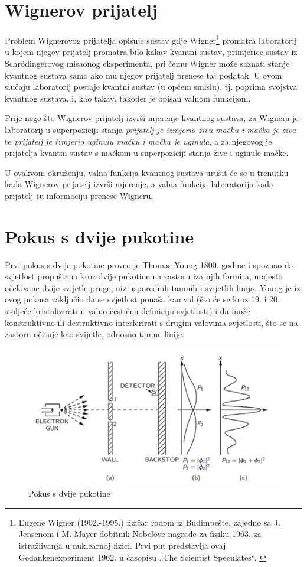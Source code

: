 \documentclass[twoside]{article}
\begin{document}
\section{Wignerov prijatelj}

Problem Wignerovog prijatelja opisuje sustav gdje Wigner\footnote{Eugene Wigner (1902.-1995.) fizičar rodom iz Budimpešte, zajedno sa J. Jensenom i M. Mayer dobitnik Nobelove nagrade za fiziku 1963. za istražiivanja u nuklearnoj fizici. Prvi put predstavlja ovaj Gedankenexperiment 1962. u časopisu „The Scientist Speculates“. \cite{Britannica2021}} promatra laboratorij u kojem njegov prijatelj promatra bilo kakav kvantni sustav, primjerice sustav iz Schrödingerovog misaonog eksperimenta, pri čemu Wigner može saznati stanje kvantnog sustava samo ako mu njegov prijatelj prenese taj podatak. U ovom slučaju laboratorij postaje kvantni sustav (u općem smislu), tj. poprima svojstva kvantnog sustava, i, kao takav, također je opisan valnom funkcijom.

Prije nego što Wignerov prijatelj izvrši mjerenje kvantnog sustava, za Wignera je laboratorij u superpoziciji stanja \emph{prijatelj je izmjerio živu mačku i mačka je živa} te \emph{prijatelj je izmjerio uginulu mačku i mačka je uginula}, a za njegovog je prijatelja kvantni sustav s mačkom u superpoziciji stanja žive i uginule mačke. 

U ovakvom okruženju, valna funkcija kvantnog sustava urušit će se u trenutku kada Wignerov prijatelj izvrši mjerenje, a valna funkcija laboratorija kada prijatelj tu informaciju prenese Wigneru.


\section{Pokus s dvije pukotine}

Prvi pokus s dvije pukotine proveo je Thomas Young 1800. godine \cite{Young2015} i spoznao da svjetlost propuštena kroz dvije pukotine na zastoru iza njih formira, umjesto očekivane dvije svijetle pruge, niz usporednih tamnih i svijetlih linija. Young je iz ovog pokusa zaključio da se svjetlost ponaša kao val (što će se kroz 19. i 20. stoljeće kristalizirati u valno-čestičnu definiciju svjetlosti) i da može konstruktivno ili destruktivno interferirati s drugim valovima svjetlosti, što se na zastoru očituje kao svijetle, odnosno tamne linije. 

\begin{figure}[!htb]
    \centering
    \includegraphics{eksperiment-1}
    \caption{Pokus s dvije pukotine \cite{Cushing2006}}
    \label{eksperiment1}
    \end{figure}
\end{document}
